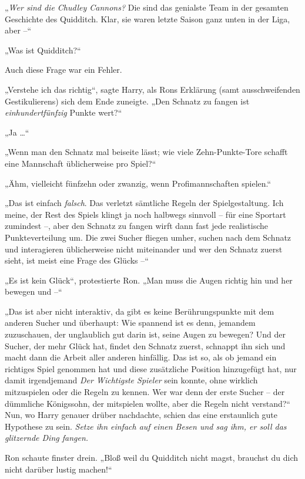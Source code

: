 {„\emph{Wer sind die Chudley Cannons?} Die sind das genialste Team in der gesamten Geschichte des Quidditch. Klar, sie waren letzte Saison ganz unten in der Liga, aber --“

„Was ist Quidditch?“

Auch diese Frage war ein Fehler.

„Verstehe ich das richtig“, sagte Harry, als Rons Erklärung (samt ausschweifenden Gestikulierens) sich dem Ende zuneigte. „Den Schnatz zu fangen ist \emph{einhundertfünfzig} Punkte wert?“

„Ja …“

„Wenn man den Schnatz mal beiseite lässt; wie viele Zehn-Punkte-Tore schafft eine Mannschaft üblicherweise pro Spiel?“

„Ähm, vielleicht fünfzehn oder zwanzig, wenn Profimannschaften spielen.“

„Das ist einfach \emph{falsch}. Das verletzt sämtliche Regeln der Spielgestaltung. Ich meine, der Rest des Spiels klingt ja noch halbwegs sinnvoll -- für eine Sportart zumindest --, aber den Schnatz zu fangen wirft dann fast jede realistische Punkteverteilung um. Die zwei Sucher fliegen umher, suchen nach dem Schnatz und interagieren üblicherweise nicht miteinander und wer den Schnatz zuerst sieht, ist meist eine Frage des Glücks --“

„Es ist kein Glück“, protestierte Ron. „Man muss die Augen richtig hin und her bewegen und --“

„Das ist aber nicht interaktiv, da gibt es keine Berührungspunkte mit dem anderen Sucher und überhaupt: Wie spannend ist es denn, jemandem zuzuschauen, der unglaublich gut darin ist, seine Augen zu bewegen? Und der Sucher, der mehr Glück hat, findet den Schnatz zuerst, schnappt ihn sich und macht dann die Arbeit aller anderen hinfällig. Das ist so, als ob jemand ein richtiges Spiel genommen hat und diese zusätzliche Position hinzugefügt hat, nur damit irgendjemand \emph{Der Wichtigste Spieler} sein konnte, ohne wirklich mitzuspielen oder die Regeln zu kennen. Wer war denn der erste Sucher -- der dümmliche Königssohn, der mitspielen wollte, aber die Regeln nicht verstand?“\\ Nun, wo Harry genauer drüber nachdachte, schien das eine erstaunlich gute Hypothese zu sein. \emph{Setze ihn einfach auf einen Besen und sag ihm, er soll das glitzernde Ding fangen.}

Ron schaute finster drein. „Bloß weil du Quidditch nicht magst, brauchst du dich nicht darüber lustig machen!“

}
